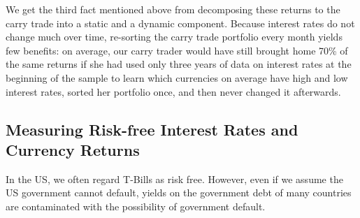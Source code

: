 \documentclass{ar-1col}
\begin{document}
We get the third fact mentioned above from decomposing these returns to the carry trade into a static and a dynamic component. Because interest rates do not change much over time, re-sorting the carry trade portfolio every month yields few benefits: on average, our carry trader would have still brought home 70\% of the same returns if she had used only three years of data on interest rates at the beginning of the sample to learn which currencies on average have high and low interest rates, sorted her portfolio once, and then never changed it afterwards.

\begin{textbox}[]\section{Measuring Risk-free Interest Rates and Currency Returns}
    In the US, we often regard T-Bills as risk free. However, even if we assume the US government cannot default, yields on the government debt of many countries are contaminated with the possibility of government default.


\end{textbox}
\end{document}
